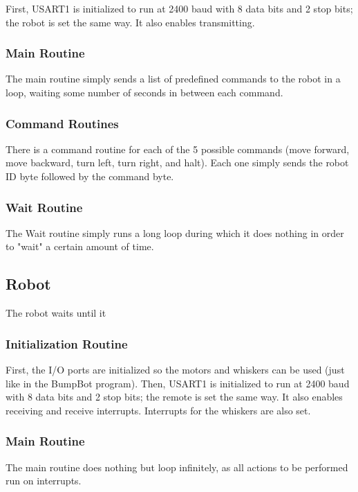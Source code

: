 \documentclass[12pt,letterpaper]{article}
\begin{document}
First, USART1 is initialized to run at 2400 baud with 8 data bits and 2 stop
bits; the robot is set the same way.  It also enables transmitting.

\subsubsection{Main Routine}

The main routine simply sends a list of predefined commands to the robot in a
loop, waiting some number of seconds in between each command.

\subsubsection{Command Routines}

There is a command routine for each of the 5 possible commands (move forward,
move backward, turn left, turn right, and halt).  Each one simply sends the
robot ID byte followed by the command byte.

\subsubsection{Wait Routine}

The Wait routine simply runs a long loop during which it does nothing in order
to "wait" a certain amount of time.

\subsection{Robot}

The robot waits until it 

\subsubsection{Initialization Routine}

First, the I/O ports are initialized so the motors and whiskers can be used
(just like in the BumpBot program).  Then, USART1 is initialized to run at 2400
baud with 8 data bits and 2 stop bits; the remote is set the same way.  It also
enables receiving and receive interrupts.  Interrupts for the whiskers are also
set.

\subsubsection{Main Routine}

The main routine does nothing but loop infinitely, as all actions to be
performed run on interrupts.
\end{document}
